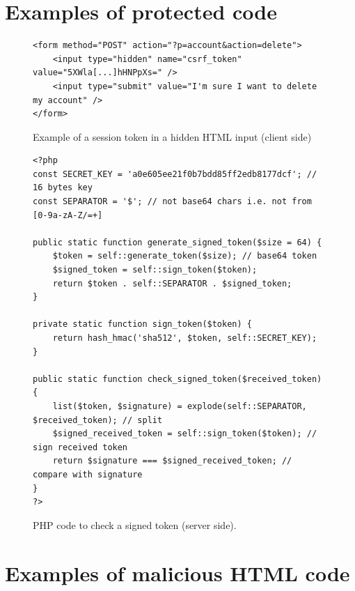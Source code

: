 \documentclass[a4paper,11pt,openany]{report}
\begin{document}
\chapter{Examples of protected code}  \label{app:protected_code}

\begin{figure}[h!t]
  \begin{verbatim}
<form method="POST" action="?p=account&action=delete">
    <input type="hidden" name="csrf_token" value="5XWla[...]hHNPpXs=" />
    <input type="submit" value="I'm sure I want to delete my account" />
</form>
  \end{verbatim}
  \caption{Example of a session token in a hidden HTML input (client side)}
  \label{figure:session_token_client}
\end{figure}

\begin{figure}[ht!]
  \begin{verbatim}
<?php
const SECRET_KEY = 'a0e605ee21f0b7bdd85ff2edb8177dcf'; // 16 bytes key
const SEPARATOR = '$'; // not base64 chars i.e. not from [0-9a-zA-Z/=+]

public static function generate_signed_token($size = 64) {
    $token = self::generate_token($size); // base64 token
    $signed_token = self::sign_token($token);
    return $token . self::SEPARATOR . $signed_token;
}

private static function sign_token($token) {
    return hash_hmac('sha512', $token, self::SECRET_KEY);
}
  
public static function check_signed_token($received_token) {
    list($token, $signature) = explode(self::SEPARATOR, $received_token); // split
    $signed_received_token = self::sign_token($token); // sign received token
    return $signature === $signed_received_token; // compare with signature
}
?>
  \end{verbatim}
  \caption{PHP code to check a signed token (server side).}
  \label{figure:signed_token_server}
  \end{figure}
  
\chapter{Examples of malicious HTML code} \label{app:csrf_attack}

\vspace*{-30pt}
\end{document}
